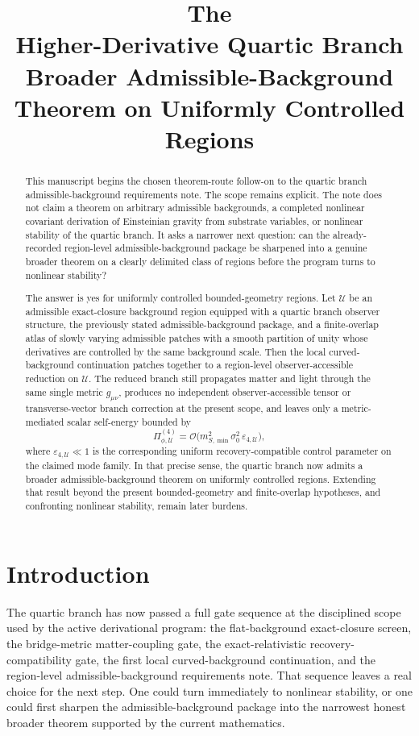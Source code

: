 \documentclass[11pt]{article}
\title{\textbf{The \TheoryName{}}\\[0.4em]
\large Higher-Derivative Quartic Branch Broader Admissible-Background Theorem on Uniformly Controlled Regions}
\author{}
\date{}
\begin{document}
\maketitle

\begin{abstract}
This manuscript begins the chosen theorem-route follow-on to the quartic branch admissible-background requirements note. The scope remains explicit. The note does not claim a theorem on arbitrary admissible backgrounds, a completed nonlinear covariant derivation of Einsteinian gravity from substrate variables, or nonlinear stability of the quartic branch. It asks a narrower next question: can the already-recorded region-level admissible-background package be sharpened into a genuine broader theorem on a clearly delimited class of regions before the program turns to nonlinear stability?

The answer is yes for uniformly controlled bounded-geometry regions. Let \(\mathcal U\) be an admissible exact-closure background region equipped with a quartic branch observer structure, the previously stated admissible-background package, and a finite-overlap atlas of slowly varying admissible patches with a smooth partition of unity whose derivatives are controlled by the same background scale. Then the local curved-background continuation patches together to a region-level observer-accessible reduction on \(\mathcal U\). The reduced branch still propagates matter and light through the same single metric \(g_{\mu\nu}\), produces no independent observer-accessible tensor or transverse-vector branch correction at the present scope, and leaves only a metric-mediated scalar self-energy bounded by
\[
\Pi_{\phi,\mathcal U}^{(4)}
=
\mathcal O\!\bigl(m_{S,\min}^2\sigma_0^2\,\varepsilon_{4,\mathcal U}\bigr),
\]
where \(\varepsilon_{4,\mathcal U}\ll 1\) is the corresponding uniform recovery-compatible control parameter on the claimed mode family. In that precise sense, the quartic branch now admits a broader admissible-background theorem on uniformly controlled regions. Extending that result beyond the present bounded-geometry and finite-overlap hypotheses, and confronting nonlinear stability, remain later burdens.
\end{abstract}

\section{Introduction}

The quartic branch has now passed a full gate sequence at the disciplined scope used by the active derivational program: the flat-background exact-closure screen, the bridge-metric matter-coupling gate, the exact-relativistic recovery-compatibility gate, the first local curved-background continuation, and the region-level admissible-background requirements note. That sequence leaves a real choice for the next step. One could turn immediately to nonlinear stability, or one could first sharpen the admissible-background package into the narrowest honest broader theorem supported by the current mathematics.
\end{document}
